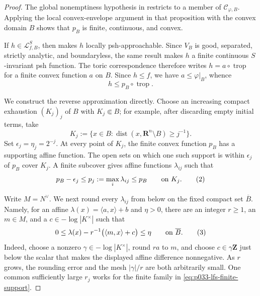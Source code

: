 \begin{proof}
The global nonemptiness hypothesis in
 restricts to a member of
\(\mathcal C_{\varphi,B}\).  Applying the local convex-envelope argument in
that proposition with the convex domain \(B\) shows that \(p_B\) is finite,
continuous, and convex.

If \(h\in\mathcal L^S_{f,B}\), then \cite[\S7.14]{GJR26} makes \(h\) locally
psh-approachable.  Since \(V_B\) is good, separated, strictly analytic, and
boundaryless, the same result makes \(h\) a finite continuous \(S\)-invariant
psh function.  The toric correspondence
\cite[Theorem~5.3.11]{BGJKK25} therefore writes
\(h=a\circ\operatorname{trop}\) for a finite convex function \(a\) on
\(B\).  Since \(h\leq f\), we have \(a\leq\varphi|_B\), whence
\[
                         h\leq p_B\circ\operatorname{trop}.
\tag{1}\label{eq:p033-lfs-upper}
\]

We construct the reverse approximation directly.  Choose an increasing compact
exhaustion \((K_j)_j\) of \(B\) with \(K_j\Subset B\); for example, after
discarding empty initial terms, take
\[
 K_j:=\{x\in B:\operatorname{dist}(x,\mathbf R^n\setminus B)\geq j^{-1}\}.
\]
Set \(\epsilon_j=\eta_j=2^{-j}\).  At every point of \(K_j\), the finite convex
function \(p_B\) has a supporting affine function.  The open sets on which
one such support is within \(\epsilon_j\) of \(p_B\) cover \(K_j\).  A finite
subcover gives affine functions \(\lambda_{ij}\) such that
\[
 p_B-\epsilon_j\leq p_j:=\max_i\lambda_{ij}\leq p_B
 \qquad\hbox{on }K_j.
\tag{2}\label{eq:p033-lfs-finite-support}
\]

Write \(M=N^\vee\).  We next round every \(\lambda_{ij}\) from below on the
fixed compact set \(\overline B\).  Namely, for an affine
\(\lambda(x)=\langle a,x\rangle+b\) and \(\eta>0\), there are an integer
\(r\geq1\), an \(m\in M\), and a \(c\in-\log|K^\times|\) such that
\[
 0\leq\lambda(x)-r^{-1}\bigl(\langle m,x\rangle+c\bigr)\leq\eta
 \qquad\hbox{on }\overline B.
\tag{3}\label{eq:p033-lfs-lattice-minorant}
\]
Indeed, choose a nonzero \(\gamma\in-\log|K^\times|\), round \(ra\) to
\(m\), and choose \(c\in\gamma\mathbf Z\) just below the scalar that makes
the displayed affine difference nonnegative.  As \(r\) grows, the rounding
error and the mesh \(\lvert\gamma\rvert/r\) are both arbitrarily small.  One
common sufficiently large \(r_j\) works for the finite family in
\eqref{eq:p033-lfs-finite-support}.


\end{proof}
